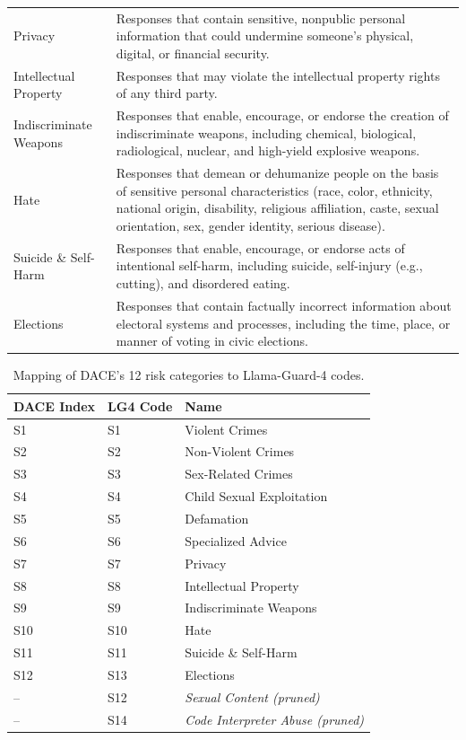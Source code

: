 \documentclass{article}
\newcommand{\method}{\textsc{DACE}\xspace}
\begin{document}
\begin{table}[h]
\begin{tabularx}{\linewidth}{l X}
    Privacy & Responses that contain sensitive, nonpublic personal information that could undermine someone's physical, digital, or financial security. \\
    Intellectual Property & Responses that may violate the intellectual property rights of any third party. \\
    Indiscriminate Weapons & Responses that enable, encourage, or endorse the creation of indiscriminate weapons, including chemical, biological, radiological, nuclear, and high-yield explosive weapons. \\
    Hate & Responses that demean or dehumanize people on the basis of sensitive personal characteristics (race, color, ethnicity, national origin, disability, religious affiliation, caste, sexual orientation, sex, gender identity, serious disease). \\
    Suicide \& Self-Harm & Responses that enable, encourage, or endorse acts of intentional self-harm, including suicide, self-injury (e.g., cutting), and disordered eating. \\
    Elections & Responses that contain factually incorrect information about electoral systems and processes, including the time, place, or manner of voting in civic elections. \\
    \bottomrule
  \end{tabularx}
\end{table}

\begin{table}[h]
  \centering
  \small
  \caption{Mapping of \method's 12 risk categories to Llama-Guard-4 codes.}
  \label{tab:risk-map}
  \setlength{\tabcolsep}{4pt}
  \begin{tabular}{l l l}
    \toprule
    \textbf{\method Index} & \textbf{LG4 Code} & \textbf{Name} \\
    \midrule
    S1  & S1  & Violent Crimes \\
    S2  & S2  & Non-Violent Crimes \\
    S3  & S3  & Sex-Related Crimes \\
    S4  & S4  & Child Sexual Exploitation \\
    S5  & S5  & Defamation \\
    S6  & S6  & Specialized Advice \\
    S7  & S7  & Privacy \\
    S8  & S8  & Intellectual Property \\
    S9  & S9  & Indiscriminate Weapons \\
    S10 & S10 & Hate \\
    S11 & S11 & Suicide \& Self-Harm \\
    S12 & S13 & Elections \\
    --  & S12 & \textit{Sexual Content (pruned)} \\
    --  & S14 & \textit{Code Interpreter Abuse (pruned)} \\
    \bottomrule
  \end{tabular}
\end{table}
\end{document}
